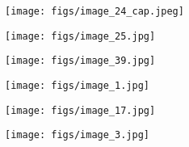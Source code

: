 \documentclass[10pt,twocolumn,letterpaper]{article}
\begin{document}
\begin{figure}[!t]
\centering
    \begin{subfigure}{0.17\linewidth}
        \centering
        \texttt{[image: figs/image\_24\_cap.jpeg]}
        \vspace{-5mm}
    \end{subfigure}
    \begin{subfigure}{0.132\linewidth}
        \centering
        \texttt{[image: figs/image\_25.jpg]}
        \vspace{-5mm}
    \end{subfigure}
    \begin{subfigure}{0.142\linewidth}
        \centering
        \texttt{[image: figs/image\_39.jpg]}
        \vspace{-5mm}
    \end{subfigure}
    \begin{subfigure}{0.142\linewidth}
        \centering
        \texttt{[image: figs/image\_1.jpg]}
        \vspace{-5mm}
    \end{subfigure}
    \begin{subfigure}{0.136\linewidth}
        \centering
        \texttt{[image: figs/image\_17.jpg]}
        \vspace{-5mm}
    \end{subfigure}
    \begin{subfigure}{0.135\linewidth}
        \centering
        \texttt{[image: figs/image\_3.jpg]}
        \vspace{-5mm}
    \end{subfigure}


\end{figure}
\end{document}
